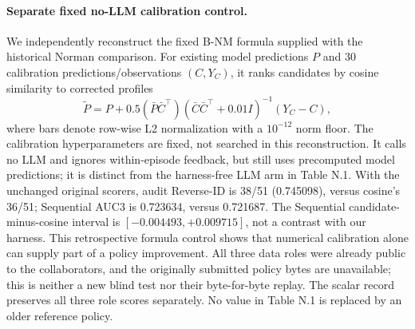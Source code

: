 \paragraph{Separate fixed no-LLM calibration control.}
We independently reconstruct the fixed B-NM formula supplied with the historical Norman comparison. For existing model predictions $P$ and 30 calibration predictions/observations $(C,Y_C)$, it ranks candidates by cosine similarity to corrected profiles
\[
\widetilde P=P+0.5(\bar P\bar C^\top)
(\bar C\bar C^\top+0.01I)^{-1}(Y_C-C),
\]
where bars denote row-wise L2 normalization with a $10^{-12}$ norm floor. The calibration hyperparameters are fixed, not searched in this reconstruction. It calls no LLM and ignores within-episode feedback, but still uses precomputed model predictions; it is distinct from the harness-free LLM arm in Table N.1. With the unchanged original scorers, audit Reverse-ID is 38/51 (0.745098), versus cosine's 36/51; Sequential AUC3 is 0.723634, versus 0.721687. The Sequential candidate-minus-cosine interval is $[-0.004493,+0.009715]$, not a contrast with our harness. This retrospective formula control shows that numerical calibration alone can supply part of a policy improvement. All three data roles were already public to the collaborators, and the originally submitted policy bytes are unavailable; this is neither a new blind test nor their byte-for-byte replay. The scalar record  preserves all three role scores separately. No value in Table N.1 is replaced by an older reference policy.

